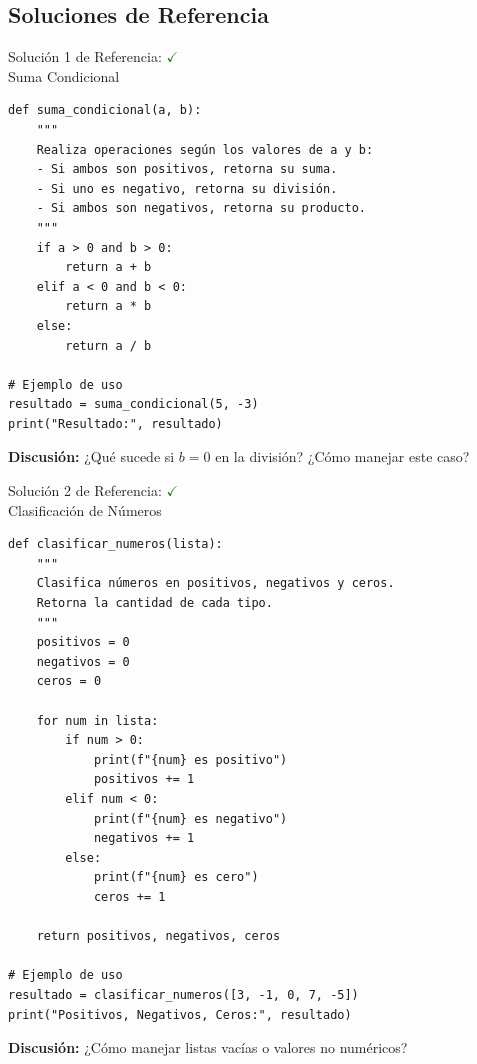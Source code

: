 \documentclass[10pt]{beamer}
\begin{document}
\begin{solutionblock}
\section{Soluciones de Referencia}
\begin{frame}[fragile]{Solución 1 de Referencia: \hfill \textcolor{green}{$\checkmark$} \\ 
Suma Condicional}
\begin{verbatim}
def suma_condicional(a, b):
    """
    Realiza operaciones según los valores de a y b:
    - Si ambos son positivos, retorna su suma.
    - Si uno es negativo, retorna su división.
    - Si ambos son negativos, retorna su producto.
    """
    if a > 0 and b > 0:
        return a + b
    elif a < 0 and b < 0:
        return a * b
    else:
        return a / b

# Ejemplo de uso
resultado = suma_condicional(5, -3)
print("Resultado:", resultado)
\end{verbatim}
\textbf{Discusión:} ¿Qué sucede si \( b = 0 \) en la división? ¿Cómo manejar este caso?
\end{frame}

\begin{frame}[fragile]{Solución 2 de Referencia: \hfill \textcolor{green}{$\checkmark$} \\ 
Clasificación de Números}
\begin{verbatim}
def clasificar_numeros(lista):
    """
    Clasifica números en positivos, negativos y ceros.
    Retorna la cantidad de cada tipo.
    """
    positivos = 0
    negativos = 0
    ceros = 0

    for num in lista:
        if num > 0:
            print(f"{num} es positivo")
            positivos += 1
        elif num < 0:
            print(f"{num} es negativo")
            negativos += 1
        else:
            print(f"{num} es cero")
            ceros += 1

    return positivos, negativos, ceros

# Ejemplo de uso
resultado = clasificar_numeros([3, -1, 0, 7, -5])
print("Positivos, Negativos, Ceros:", resultado)
\end{verbatim}
\textbf{Discusión:} ¿Cómo manejar listas vacías o valores no numéricos?
\end{frame}


\end{solutionblock}
\end{document}
